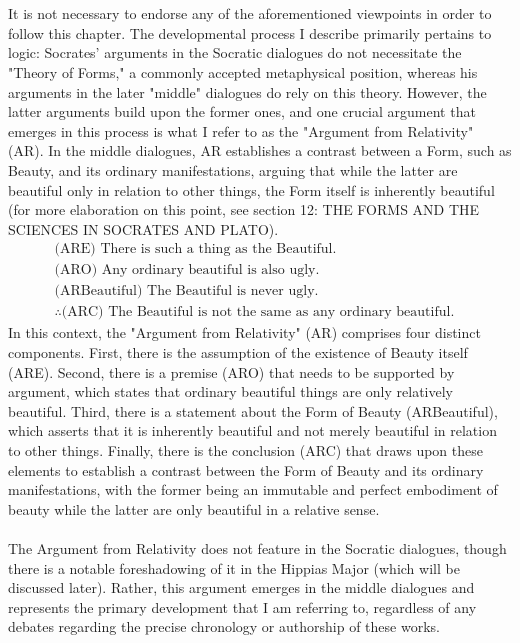 \\
\\
It is not necessary to endorse any of the aforementioned viewpoints in order to follow this chapter. The developmental process I describe primarily pertains to logic: Socrates' arguments in the Socratic dialogues do not necessitate the "Theory of Forms," a commonly accepted metaphysical position, whereas his arguments in the later "middle" dialogues do rely on this theory. However, the latter arguments build upon the former ones, and one crucial argument that emerges in this process is what I refer to as the "Argument from Relativity" (AR). In the middle dialogues, AR establishes a contrast between a Form, such as Beauty, and its ordinary manifestations, arguing that while the latter are beautiful only in relation to other things, the Form itself is inherently beautiful (for more elaboration on this point, see section 12: THE FORMS AND THE SCIENCES IN SOCRATES AND PLATO).
\begin{align*}
    \text{(ARE) There is such a thing as the Beautiful.}&\\
    \text{(ARO) Any ordinary beautiful is also ugly.}&\\
    \text{(ARBeautiful) The Beautiful is never ugly.}&\\
    \therefore \text{(ARC) The Beautiful is not the same as any ordinary beautiful.}&
\end{align*}
In this context, the "Argument from Relativity" (AR) comprises four distinct components. First, there is the assumption of the existence of Beauty itself (ARE). Second, there is a premise (ARO) that needs to be supported by argument, which states that ordinary beautiful things are only relatively beautiful. Third, there is a statement about the Form of Beauty (ARBeautiful), which asserts that it is inherently beautiful and not merely beautiful in relation to other things. Finally, there is the conclusion (ARC) that draws upon these elements to establish a contrast between the Form of Beauty and its ordinary manifestations, with the former being an immutable and perfect embodiment of beauty while the latter are only beautiful in a relative sense.
\\
\\
The Argument from Relativity does not feature in the Socratic dialogues, though there is a notable foreshadowing of it in the Hippias Major (which will be discussed later). Rather, this argument emerges in the middle dialogues and represents the primary development that I am referring to, regardless of any debates regarding the precise chronology or authorship of these works.
